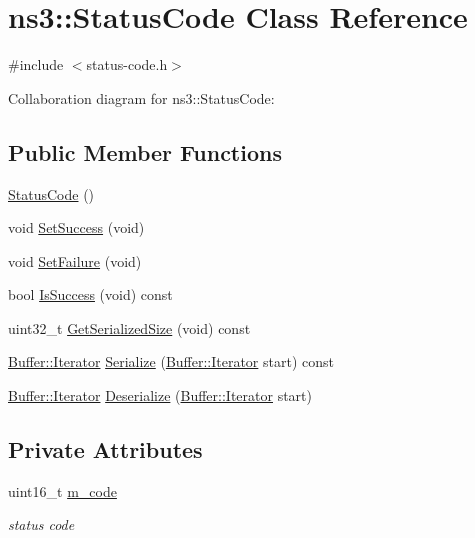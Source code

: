 \hypertarget{classns3_1_1StatusCode}{}\section{ns3\+:\+:Status\+Code Class Reference}
\label{classns3_1_1StatusCode}


{\ttfamily \#include $<$status-\/code.\+h$>$}



Collaboration diagram for ns3\+:\+:Status\+Code\+:
\subsection*{Public Member Functions}
\begin{DoxyCompactItemize}
\item 
\hyperlink{classns3_1_1StatusCode_a386e08ceb2fd8234c25ecaea3a7e009b}{Status\+Code} ()
\item 
void \hyperlink{classns3_1_1StatusCode_afc87e9e7e5d6e945c8e85610667ead48}{Set\+Success} (void)
\item 
void \hyperlink{classns3_1_1StatusCode_aa23024db49847b57ce31f69ae3dbb64c}{Set\+Failure} (void)
\item 
bool \hyperlink{classns3_1_1StatusCode_aca4142ed17d432ff8cd9ffe0e30709d4}{Is\+Success} (void) const 
\item 
uint32\+\_\+t \hyperlink{classns3_1_1StatusCode_ab66588997984f70026b71d68f6733fd2}{Get\+Serialized\+Size} (void) const 
\item 
\hyperlink{classns3_1_1Buffer_1_1Iterator}{Buffer\+::\+Iterator} \hyperlink{classns3_1_1StatusCode_abebdc2f5497fcca072299400e4ee1b2b}{Serialize} (\hyperlink{classns3_1_1Buffer_1_1Iterator}{Buffer\+::\+Iterator} start) const 
\item 
\hyperlink{classns3_1_1Buffer_1_1Iterator}{Buffer\+::\+Iterator} \hyperlink{classns3_1_1StatusCode_a596cb65ea8362200fa36751d156753f8}{Deserialize} (\hyperlink{classns3_1_1Buffer_1_1Iterator}{Buffer\+::\+Iterator} start)
\end{DoxyCompactItemize}
\subsection*{Private Attributes}
\begin{DoxyCompactItemize}
\item 
uint16\+\_\+t \hyperlink{classns3_1_1StatusCode_aaae1380bdeadf92bb28fc48c0775764b}{m\+\_\+code}
\begin{DoxyCompactList}\small\item\em status code \end{DoxyCompactList}\end{DoxyCompactItemize}


